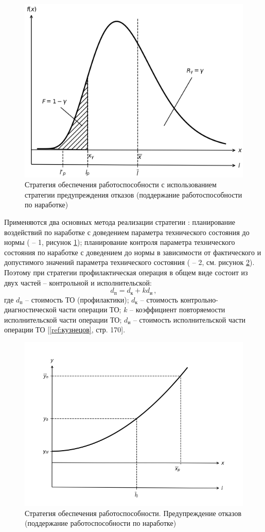 \documentclass[../nirs.tex]{subfiles}
\begin{document}
\begin{figure}[H]
\centering
\includegraphics[keepaspectratio,width=\textwidth]{./images/pdf.b.png}
    \caption{Стратегия обеспечения работоспособности с использованием стратегии
    предупреждения отказов (поддержание работоспособности по наработке)}
\label{fig:pdf.b}
\end{figure}

Применяются два основных метода реализации стратегии : планирование
воздействий по наработке с доведением параметра технического состояния до нормы
( -- 1, рисунок \ref{fig:pdf.b}); планирование контроля параметра
технического состояния по наработке с доведением до нормы в зависимости от
фактического и допустимого значений параметра технического состояния ( --
2, см. рисунок \ref{fig:pdf.c}). Поэтому при стратегии  профилактическая
операция в общем виде состоит из двух частей -- контрольной и исполнительской:
\begin{equation*}
    d_{\text{п}} = d_{\text{к}} + k d_{\text{и}}\,,
\end{equation*}
где $d_{\text{п}}$ -- стоимость ТО (профилактики); $d_{\text{к}}$ -- стоимость
контрольно-диагностической части операции ТО; $k$ -- коэффициент повторяемости
исполнительской части операции ТО; $d_{\text{и}}$ -- стоимость исполнительской
части операции ТО [\ref{ref:кузнецов}, стр. 170].

\begin{figure}[H]
\centering
\includegraphics[keepaspectratio,width=\textwidth]{./images/pdf.c.png}
\caption{Стратегия обеспечения работоспособности. Предупреждение отказов
    (поддержание работоспособности по наработке)}
\label{fig:pdf.c}
\end{figure}
\end{document}
